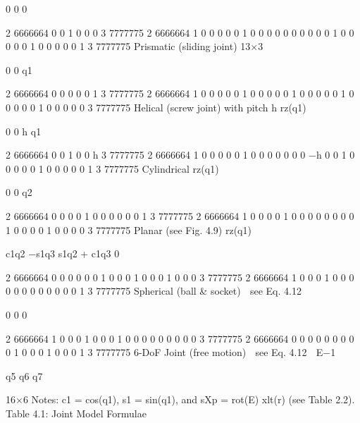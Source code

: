 0 0 0

2 6666664 0 0 1 0 0 0 3 7777775 2 6666664 1 0 0 0 0 0 1 0 0 0 0 0 0 0 0 0 0 1 0 0 0 0 0 1 0 0 0 0 0 1 3 7777775 Prismatic (sliding joint) 13×3

0 0 q1

2 6666664 0 0 0 0 0 1 3 7777775 2 6666664 1 0 0 0 0 0 1 0 0 0 0 0 1 0 0 0 0 0 1 0 0 0 0 0 1 0 0 0 0 0 3 7777775 Helical (screw joint) with pitch h rz(q1)

0 0 h q1

2 6666664 0 0 1 0 0 h 3 7777775 2 6666664 1 0 0 0 0 0 1 0 0 0 0 0 0 0 −h 0 0 1 0 0 0 0 0 1 0 0 0 0 0 1 3 7777775 Cylindrical rz(q1)

0 0 q2

2 6666664 0 0 0 0 1 0 0 0 0 0 0 1 3 7777775 2 6666664 1 0 0 0 0 1 0 0 0 0 0 0 0 0 1 0 0 0 0 1 0 0 0 0 3 7777775 Planar (see Fig. 4.9) rz(q1)

c1q2 −s1q3 s1q2 + c1q3 0

2 6666664 0 0 0 0 0 0 1 0 0 0 1 0 0 0 1 0 0 0 3 7777775 2 6666664 1 0 0 0 1 0 0 0 0 0 0 0 0 0 0 0 0 1 3 7777775 Spherical (ball \& socket)  see Eq. 4.12 

0 0 0

2 6666664 1 0 0 0 1 0 0 0 1 0 0 0 0 0 0 0 0 0 3 7777775 2 6666664 0 0 0 0 0 0 0 0 0 1 0 0 0 1 0 0 0 1 3 7777775 6-DoF Joint (free motion)  see Eq. 4.12  E−1

q5 q6 q7

16×6 Notes: c1 = cos(q1), s1 = sin(q1), and sXp = rot(E) xlt(r) (see Table 2.2). Table 4.1: Joint Model Formulae

